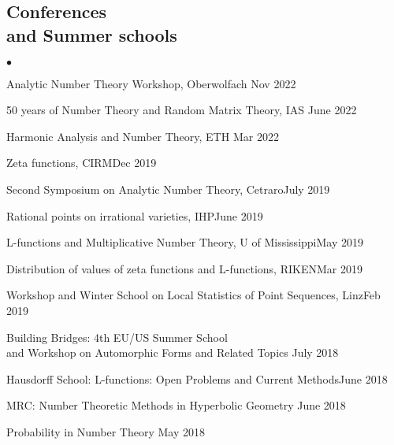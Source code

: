 \documentclass[margin,line,pifont,palatino,courier,10pt]{res}
\newenvironment{list1}{
  \begin{list}{$\bullet$}{%
      \setlength{\itemsep}{0in}
      \setlength{\parsep}{0in} \setlength{\parskip}{0in}
      \setlength{\topsep}{0in} \setlength{\partopsep}{0in}
      \setlength{\leftmargin}{0.17in}}}{\end{list}}
\begin{document}
\begin{resume}
\section{\sc Conferences\\ and Summer schools}
\begin{list1}
\item {Analytic Number Theory Workshop, Oberwolfach} \hfill{Nov 2022}

\item {50 years of Number Theory and Random Matrix Theory, IAS} \hfill{June 2022}

\item {Harmonic Analysis and Number Theory, ETH} \hfill{Mar 2022}

\item {Zeta functions, CIRM}{\hfill Dec 2019}

\item {Second Symposium on Analytic Number Theory, Cetraro}{\hfill July 2019}

\item {Rational points on irrational varieties, IHP}{\hfill June 2019}

\item {L-functions and Multiplicative Number Theory, U of Mississippi}{\hfill May 2019}

\item {Distribution of values of zeta functions and L-functions, RIKEN}{\hfill Mar 2019}

\item {Workshop and Winter School on Local Statistics of Point Sequences, Linz}{\hfill Feb 2019}

\item {Building Bridges: 4th EU/US Summer School \\and Workshop on Automorphic Forms and Related Topics
} {\hfill  July 2018}

\item {Hausdorff School: L-functions: Open Problems and Current Methods}{\hfill  June 2018}

\item {MRC: Number Theoretic Methods
	in Hyperbolic Geometry
	} {\hfill  June 2018}

\item {Probability in Number Theory}{ \hfill  May 2018}


\end{list1}
\end{resume}
\end{document}

